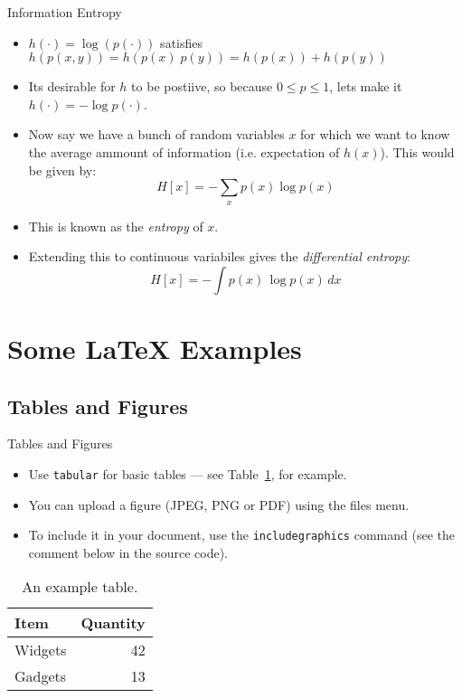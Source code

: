 \documentclass{beamer}
\begin{document}
\begin{frame}{Information Entropy}
\begin{itemize}
\item $h(\cdot ) = \log ( p(\cdot ))$ satisfies $h(p(x,y)) = h(p(x)\; p(y)) = h(p(x)) + h(p(y))$
\item Its desirable for $h$ to be postiive, so because $0 \leq p \leq 1$, lets make it $h(\cdot ) = -\log p(\cdot )$.
\item Now say we have a bunch of random variables $x$ for which we want to know the average ammount of information (i.e. expectation of $h(x)$). This would be given by:
  \[H[x] = - \sum_x p(x) \log p(x) \]
\item This is known as the \textit{entropy} of $x$.
\item Extending this to continuous variabiles gives the \textit{differential entropy}:
  \[H[x] = - \int p(x)\, \log p(x)\, dx\]
\end{itemize}

\end{frame}

\section{Some \LaTeX{} Examples}

\subsection{Tables and Figures}

\begin{frame}{Tables and Figures}

\begin{itemize}
\item Use \texttt{tabular} for basic tables --- see Table~\ref{tab:widgets}, for example.
\item You can upload a figure (JPEG, PNG or PDF) using the files menu. 
\item To include it in your document, use the \texttt{includegraphics} command (see the comment below in the source code).
\end{itemize}


\begin{table}
\centering
\begin{tabular}{l|r}
Item & Quantity \\\hline
Widgets & 42 \\
Gadgets & 13
\end{tabular}
\caption{\label{tab:widgets}An example table.}
\end{table}

\end{frame}
\end{document}
